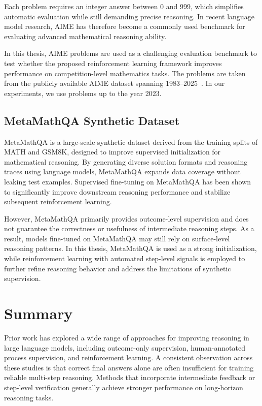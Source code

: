 \documentclass[12pt]{report}
\begin{document}
Each problem requires an integer answer between 0 and 999, which simplifies automatic evaluation while still demanding precise reasoning. In recent language model research, AIME has therefore become a commonly used benchmark for evaluating advanced mathematical reasoning ability.

In this thesis, AIME problems are used as a challenging evaluation benchmark to test whether the proposed reinforcement learning framework improves performance on competition-level mathematics tasks. The problems are taken from the publicly available AIME dataset spanning 1983--2025~\cite{mukherjee2025aime}. 
In our experiments, we use problems up to the year 2023.

\subsection{MetaMathQA Synthetic Dataset}
MetaMathQA is a large-scale synthetic dataset derived from the training splits of MATH and GSM8K, designed to improve supervised initialization for mathematical reasoning\cite{yu2024metamathbootstrapmathematicalquestions}. By generating diverse solution formats and reasoning traces using language models, MetaMathQA expands data coverage without leaking test examples. Supervised fine-tuning on MetaMathQA has been shown to significantly improve downstream reasoning performance and stabilize subsequent reinforcement learning.

However, MetaMathQA primarily provides outcome-level supervision and does not guarantee the correctness or usefulness of intermediate reasoning steps. As a result, models fine-tuned on MetaMathQA may still rely on surface-level reasoning patterns. In this thesis, MetaMathQA is used as a strong initialization, while reinforcement learning with automated step-level signals is employed to further refine reasoning behavior and address the limitations of synthetic supervision.

\section{Summary}

Prior work has explored a wide range of approaches for improving reasoning in large language models, including outcome-only supervision, human-annotated process supervision, and reinforcement learning. A consistent observation across these studies is that correct final answers alone are often insufficient for training reliable multi-step reasoning. Methods that incorporate intermediate feedback or step-level verification generally achieve stronger performance on long-horizon reasoning tasks.
\end{document}

